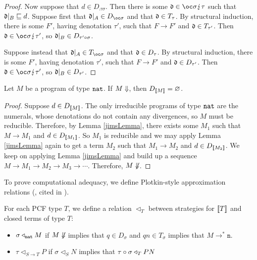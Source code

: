 \documentclass{entcs} \usepackage{prentcsmacro}
\newcommand{\dv}{{\lightning}}
\newcommand{\opto}{\longrightarrow}
\newcommand{\n}{{\mathtt{n}}}
\newcommand{\0}{{\mathtt{0}}}
\newcommand{\plot}{\triangleleft}
\begin{document}
\begin{proof}
    Now suppose that $d\in D_{\comp\tau\sigma}$.  Then there is some $\d\in\oc\sigma\dv\tau$ such that $\mathfrak d\vert_B\sqsubseteq d$.  Suppose first that $\d\vert_A\in D_{\oc\sigma}$ and that $\mathfrak d\in T_\tau$.  By structural induction, there is some $F'$, having denotation $\tau'$, such that $F\to F'$ and $\mathfrak d\in T_{\tau'}$.  Then $\d\in\oc\sigma\dv\tau'$, so $\mathfrak d\vert_B\in D_{\tau' \circ \sigma}$.

    Suppose instead that $\d\vert_A\in T_{\oc\sigma}$ and that $\mathfrak d\in D_\tau$.  By structural induction, there is some $F'$, having denotation $\tau'$, such that $F\to F'$ and $\mathfrak d\in D_{\tau'}$.  Then $\d\in\oc\sigma\dv\tau'$, so $\mathfrak d\vert_B\in D_{\tau'}$.  
  \end{proof}

\begin{theorem}[Consistency]
  Let $M$ be a program of type ${\mathtt{nat}}$.  If $M\Downarrow$, then $D_{\left\llbracket M\right\rrbracket} = \varnothing$.
\end{theorem}
  \begin{proof}
    Suppose $d\in D_{\left\llbracket M\right\rrbracket}$.  The only irreducible programs of type ${\mathtt{nat}}$ are the numerals, whose denotations do not contain any divergences, so $M$ must be reducible.  Therefore, by Lemma \ref{jimsLemma}, there exists some $M_1$ such that $M\to M_1$ and $d\in D_{\left\llbracket M_1\right\rrbracket}$.  So $M_1$ is reducible and we may apply Lemma \ref{jimsLemma} again to get a term $M_2$ such that $M_1\to M_2$ and $d\in D_{\left\llbracket M_2\right\rrbracket}$.  We keep on applying Lemma \ref{jimsLemma} and build up a sequence $M\to M_1\to M_2\to M_3\to\cdots$.  Therefore, $M\not\Downarrow$.
  \end{proof}

To prove computational adequacy, we define Plotkin-style approximation relations (\cite{PlotkinApRels}, cited in \cite{LairdOrdinalGames}).  

\begin{definition}
  For each PCF type $T$, we define a relation $\plot_T$ between strategies for $\left\llbracket T\right\rrbracket$ and closed terms of type $T$:

  \begin{itemize}
    \item $\sigma \plot_\nat M$ if $M\not\Downarrow$ implies that $q\in D_\sigma$ and $qn\in T_\sigma$ implies that $M\opto^* \n$.
    \item $\tau \plot_{S\to T} P$ if $\sigma\plot_S N$ implies that $\icomp\tau\sigma \plot_T P N$
  \end{itemize}
\end{definition}
\end{document}
